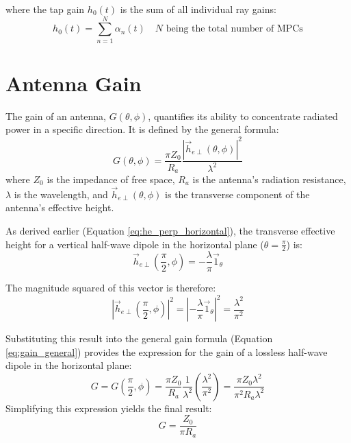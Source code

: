 where the tap gain $h_0(t)$ is the sum of all individual ray gains:
\begin{equation}
	\label{eq:narrow}
	\boxed{h_0(t) = \sum_{n=1}^{N} \alpha_n(t)} \quad N \text{ being the total number of MPCs}
\end{equation}


\section{Antenna Gain}
The gain of an antenna, $G(\theta, \phi)$, quantifies its ability to concentrate radiated power in a specific direction. It is defined by the general formula:
\begin{equation}
	G(\theta,\phi) = \frac{\pi Z_0}{R_a} \frac{|\vec{h}_{e\perp}(\theta,\phi)|^2}{\lambda^2}
	\label{eq:gain_general}
\end{equation}
where $Z_0$ is the impedance of free space, $R_a$ is the antenna's radiation resistance, $\lambda$ is the wavelength, and $\vec{h}_{e\perp}(\theta,\phi)$ is the transverse component of the antenna's effective height.

As derived earlier (Equation \ref{eq:he_perp_horizontal}), the transverse effective height for a vertical half-wave dipole in the horizontal plane ($\theta = \frac{\pi}{2}$) is:
\begin{equation}
	\vec{h}_{e\perp}\left(\frac{\pi}{2},\phi\right) = -\frac{\lambda}{\pi}\vec{1}_{\theta}
\end{equation}

The magnitude squared of this vector is therefore:
\begin{equation}
	\left|\vec{h}_{e\perp}\left(\frac{\pi}{2},\phi\right)\right|^2 = \left|-\frac{\lambda}{\pi}\vec{1}_{\theta}\right|^2 = \frac{\lambda^2}{\pi^2}
\end{equation}

Substituting this result into the general gain formula (Equation \ref{eq:gain_general}) provides the expression for the gain of a lossless half-wave dipole in the horizontal plane:
\begin{equation}
	G = G\left(\frac{\pi}{2}, \phi\right) = \frac{\pi Z_0}{R_a} \frac{1}{\lambda^2} \left(\frac{\lambda^2}{\pi^2}\right) = \frac{\pi Z_0 \lambda^2}{\pi^2 R_a \lambda^2}
\end{equation}
Simplifying this expression yields the final result:
\begin{equation}
	G = \frac{Z_0}{\pi R_a}
	\label{eq:gain_derived}
\end{equation}

